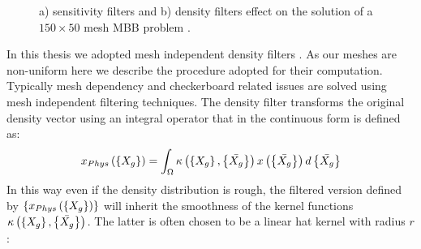 \begin{figure}[hbt!]
  \centering
       \caption{a) sensitivity filters and b) density filters effect on the solution of a $150\times 50$ mesh MBB problem \cite{andreassen2011efficient}. }
       \label{fig2.14b}
     \end{figure}
In this thesis we adopted mesh independent density filters \cite{bourdin2001filters,bruns2001topology}.  As our meshes are non-uniform here we describe the procedure adopted for their computation.
 Typically mesh dependency and checkerboard related issues are solved using mesh independent filtering techniques.
 The density filter transforms the original density vector using an integral operator that in the continuous form is defined as:
 \begin{equation}
 \label{eq2.16}
x_{Phys}\left(\left\lbrace{X_g}\right \rbrace\right)=\int_{\Omega}{\kappa\left(\left\lbrace{X_g}\right \rbrace,\left\lbrace{\bar{X_g}}\right \rbrace\right)x\left(\left\lbrace{\bar{X_g}}\right \rbrace\right)d\left\lbrace{\bar{X_g}}\right \rbrace} 
 \end{equation} 
 In this way even if the density distribution is rough, the filtered version defined by $ \left\lbrace{x_{Phys}\left(\ensuremath\left\lbrace{X_g}\right \rbrace\right)}\right \rbrace$ will inherit the smoothness of the kernel functions $\kappa\left(\left\lbrace{X_g}\right \rbrace,\left\lbrace{\bar{X_g}}\right \rbrace\right)$.
 The latter is often chosen to be a linear hat kernel with radius $r$:
